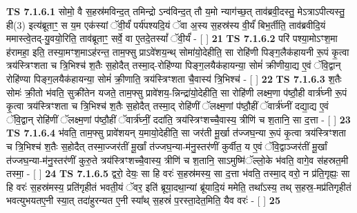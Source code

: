 \documentclass[17pt]{extarticle}
\begin{document}
                                        \textbf{ TS 7.1.6.1} \newline
                  सोमो॒ वै स॒हस्र॑मविन्द॒त् तमिन्द्रो ऽन्व॑विन्द॒त् तौ य॒मो न्याग॑च्छ॒त् ताव॑ब्रवी॒दस्तु॒ मेऽत्राऽपीत्यस्तु॒ ही(3) इत्य॑ब्रूताꣳ॒॒ स य॒म एक॑स्यां ॅवी॒र्यं॑ पर्य॑पश्यदि॒यं ॅवा अ॒स्य स॒हस्र॑स्य वी॒र्यं॑ बिभ॒र्तीति॒ ताव॑ब्रवीदि॒यं ममास्त्वे॒तद्-यु॒वयो॒रिति॒ ताव॑ब्रूताꣳ॒॒ सर्वे॒ वा ए॒तदे॒तस्यां᳚ ॅवी॒र्यं॑ - [  ] \textbf{  21} \newline
                  \newline
                                \textbf{ TS 7.1.6.2} \newline
                  परि॑ पश्या॒मोऽꣳश॒मा ह॑रामहा॒ इति॒ तस्या॒मꣳश॒माऽह॑रन्त॒ ताम॒फ्सु प्राऽवे॑शय॒न्थ् सोमा॑यो॒देहीति॒ सा रोहि॑णी पिङ्ग॒लैक॑हायनी रू॒पं कृ॒त्वा त्रय॑स्त्रिꣳशता च त्रि॒भिश्च॑ श॒तैः स॒होदैत् तस्मा॒द्-रोहि॑ण्या पिङ्ग॒लयैक॑हायन्या॒ सोमं॑ क्रीणीया॒द्य ए॒वं ॅवि॒द्वान् रोहि॑ण्या पिङ्ग॒लयैक॑हायन्या॒ सोमं॑ क्री॒णाति॒ त्रय॑स्त्रिꣳशता चै॒वास्य॑ त्रि॒भिश्च॑ - [  ] \textbf{  22 } \newline
                  \newline
                                \textbf{ TS 7.1.6.3} \newline
                  श॒तैः सोमः॑ क्री॒तो भ॑वति॒ सुक्री॑तेन यजते॒ ताम॒फ्सु प्रावे॑शय॒-न्निन्द्रा॑यो॒देहीति॒ सा रोहि॑णी लक्ष्म॒णा प॑ष्ठौ॒ही वार्त्र॑घ्नी रू॒पं कृ॒त्वा त्रय॑स्त्रिꣳशता च त्रि॒भिश्च॑ श॒तैः स॒होदैत् तस्मा॒द् रोहि॑णीं ॅलक्ष्म॒णां प॑ष्ठौ॒हीं ॅवार्त्र॑घ्नीं दद्या॒द्य ए॒वं ॅवि॒द्वान् रोहि॑णीं ॅलक्ष्म॒णां प॑ष्ठौ॒हीं ॅवार्त्र॑घ्नीं॒ ददा॑ति॒ त्रय॑स्त्रिꣳशच्चै॒वास्य॒ त्रीणि॑ च श॒तानि॒ सा द॒त्ता - [  ] \textbf{  23} \newline
                  \newline
                                \textbf{ TS 7.1.6.4} \newline
                  भ॑वति॒ ताम॒फ्सु प्रावे॑शयन् य॒मायो॒देहीति॒ सा जर॑ती मू॒र्खा त॑ज्जघ॒न्या रू॒पं कृ॒त्वा त्रय॑स्त्रिꣳशता च त्रि॒भिश्च॑ श॒तैः स॒होदैत् तस्मा॒ज्जर॑तीं मू॒र्खां त॑ज्जघ॒न्या-म॑नु॒स्तर॑णीं कुर्वीत॒ य ए॒वं ॅवि॒द्वाञ्जर॑तीं मू॒र्खां त॑ज्जघ॒न्या-म॑नु॒स्तर॑णीं कुरु॒ते त्रय॑स्त्रिꣳशच्चै॒वास्य॒ त्रीणि॑ च श॒तानि॒ साऽमुष्मि॑ॅल्लो॒के भ॑वति॒ वागे॒व स॑हस्रत॒मी तस्मा॒ - [  ] \textbf{  24} \newline
                  \newline
                                \textbf{ TS 7.1.6.5} \newline
                  द्वरो॒ देयः॒ सा हि वरः॑ स॒हस्र॑मस्य॒ सा द॒त्ता भ॑वति॒ तस्मा॒द् वरो॒ न प्र॑ति॒गृह्यः॒ सा हि वरः॑ स॒हस्र॑मस्य॒ प्रति॑गृहीतं भवती॒यं ॅवर॒ इति॑ ब्रूया॒दथा॒न्यां ब्रू॑यादि॒यं ममेति॒ तथा᳚ऽस्य॒ तथ् स॒हस्र॒-मप्र॑तिगृहीतं भवत्युभयतए॒नी स्या॒त् तदा॑हुरन्यत ए॒नी स्या᳚थ् स॒हस्रं॑ प॒रस्ता॒देत॒मिति॒ यैव वरः॑ - [  ] \textbf{  25} \newline
\end{document}
